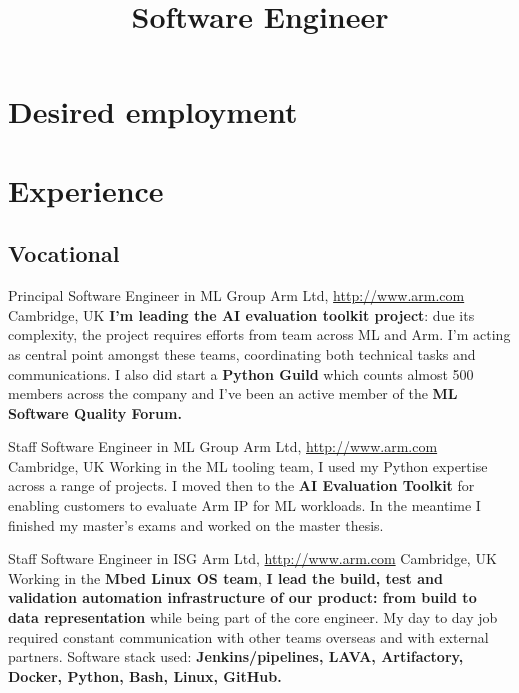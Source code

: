 \documentclass[10pt,a4paper,sans]{moderncv}
\title{Software Engineer}
\begin{document}
\makecvtitle\section{Desired employment}


\section{Experience}
\subsection{Vocational}
    {Principal Software Engineer in ML Group}
    {Arm Ltd, \url{http://www.arm.com}}
    {Cambridge, UK}{}
    {\textbf{I'm leading the AI evaluation toolkit project}: due its
    complexity, the project requires efforts from team across ML and Arm.
    I'm acting as central point amongst these teams, coordinating both
    technical tasks and communications.
    I also did start a \textbf{Python Guild} which counts almost 500 members
    across the company and I've been an active member of the \textbf{ML
    Software Quality Forum.}}

    {Staff Software Engineer in ML Group}
    {Arm Ltd, \url{http://www.arm.com}}
    {Cambridge, UK}{}
    {Working in the ML tooling team, I used my Python expertise across a range
    of projects. I moved then to the \textbf{AI Evaluation Toolkit} for
    enabling customers to evaluate Arm IP for ML workloads.
    In the meantime I finished my master's exams and worked on the master
    thesis.}

    {Staff Software Engineer in ISG}
    {Arm Ltd, \url{http://www.arm.com}}
    {Cambridge, UK}{}
    {Working in the \textbf{Mbed Linux OS team}, \textbf{I lead the build, test
    and validation automation infrastructure of our product: from build to data
    representation} while being part of the core engineer.
    My day to day job required constant communication with other teams overseas
    and with external partners.
    Software stack used: \textbf{Jenkins/pipelines, LAVA, Artifactory, Docker,
    Python, Bash, Linux, GitHub.}}
\end{document}
